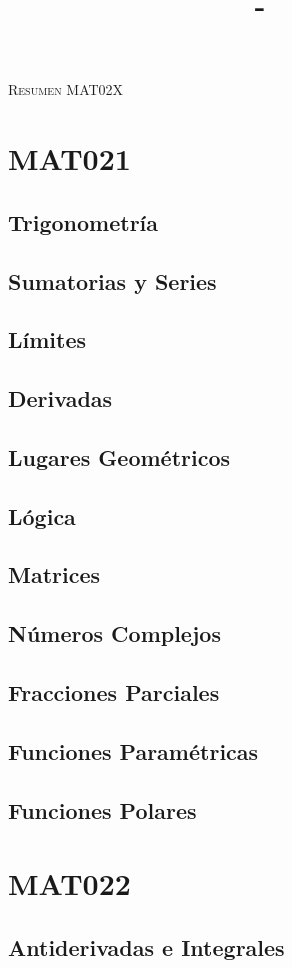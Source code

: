\documentclass[letterpaper,12pt]{book}
\title{\Titulo - \Sigla \Ramo}
\author{\Name}
\begin{document}
\thispagestyle{empty}

\begin{center}
    \huge{\textsc{Resumen MAT02X}}
\end{center}

\tableofcontents

\chapter{MAT021}
    \section{Trigonometría}
        
    \section{Sumatorias y Series}
        
    \section{Límites}
        
    \section{Derivadas}
        
    \section{Lugares Geométricos}
        
    \section{Lógica}
        
    \section{Matrices}
        
    \section{Números Complejos}
        
    \section{Fracciones Parciales}
        
    \section{Funciones Paramétricas}
        
    \section{Funciones Polares}
        
\chapter*{MAT022}
    
    \section{Antiderivadas e Integrales}
\vspace{1em}
\end{document}
